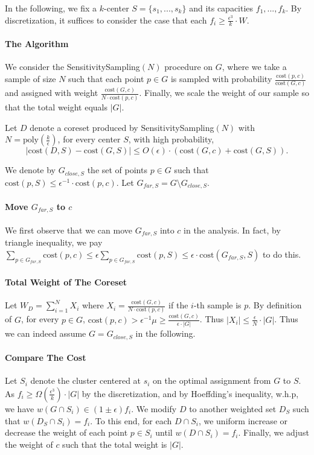 In the following, we fix a $k$-center $S=\{s_1,...,s_k\}$ and its capacities $f_1,...,f_k$. By discretization, it suffices to consider the case that each $f_i\geq \frac{\epsilon^3}{k}\cdot W$.

\paragraph{The Algorithm} We consider the \textsf{SensitivitySampling}$(N)$ procedure on $G$, where we take a sample of size $N$ such that each point $p\in G$ is sampled with probability $\frac{\mathrm{cost}(p,c)}{\mathrm{cost}(G,c)}$ and assigned with weight $\frac{\mathrm{cost}(G,c)}{N\cdot \mathrm{cost}(p,c)}$. Finally, we scale the weight of our sample so that the total weight equals $|G|$.

\begin{lemma}
Let $D$ denote a coreset produced by \textsf{SensitivitySampling}$(N)$ with $N=\mathrm{poly}(\frac{k}{\epsilon})$, for every center $S$, with high probability, 
$$
|\mathrm{cost}(D,S)-\mathrm{cost}(G,S)|
\leq O(\epsilon)\cdot (\mathrm{cost}(G,c)+\mathrm{cost}(G,S)).$$
\end{lemma}

We denote by $G_{close,S}$ the set of points $p\in G$ such that $\mathrm{cost}(p,S)\leq \epsilon^{-1}\cdot \mathrm{cost}(p,c)$. Let $G_{far,S}=G\setminus G_{close,S}$. 

\paragraph{Move $G_{far,S}$ to $c$} We first observe that we can move $G_{far,S}$ into $c$ in the analysis. In fact, by triangle inequality, we pay $\sum_{p\in G_{far,S}} \mathrm{cost}(p,c)\leq \epsilon \sum_{p\in G_{far,S}}\mathrm{cost}(p,S)\leq \epsilon\cdot \mathrm{cost}(G_{far,S},S)$ to do this.

\paragraph{Total Weight of The Coreset}
Let $W_D=\sum_{i=1}^N X_i$ where $X_i=\frac{\mathrm{cost}(G,c)}{N\cdot \mathrm{cost}(p,c)}$ if the $i$-th sample is $p$. By definition of $G$, for every $p\in G$, $\mathrm{cost}(p,c)>\epsilon^{-1}\mu\geq\frac{\mathrm{cost}(G,c)}{\epsilon\cdot |G|} $. Thus $|X_i|\leq \frac{\epsilon}{N}\cdot |G|$. Thus we can indeed assume $G=G_{close,S}$ in the following.

\paragraph{Compare The Cost} Let $S_i$ denote the cluster centered at $s_i$ on the optimal assignment from $G$ to $S$. As $f_i\geq \Omega(\frac{\epsilon^3}{k})\cdot |G|$ by the discretization, and by Hoeffding's inequality, w.h.p, we have $w(G\cap S_i)\in (1\pm\epsilon) f_i$. We modify $D$ to another weighted set $D_S$ such that $w(D_S\cap S_i)=f_i$. To this end, for each $D\cap S_i$, we uniform increase or decrease the weight of each point $p\in S_i$ until $w(D\cap S_i)=f_i$. Finally, we adjust the weight of $c$ such that the total weight is $|G|$.

